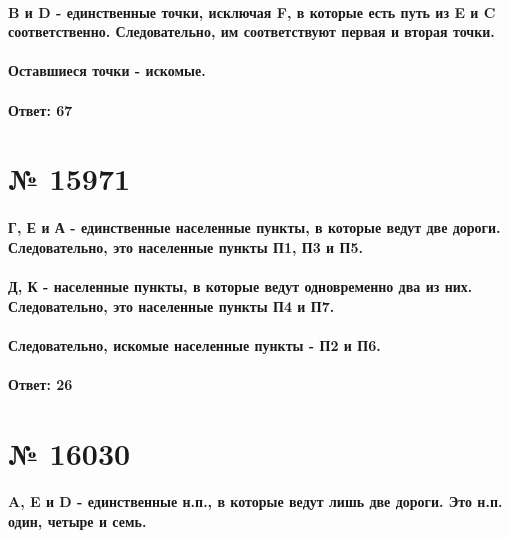\documentclass[11pt]{article} %
\begin{document}
\paragraph{B и D - единственные точки, исключая F, в которые есть путь из E и C соответственно. Следовательно, им соответствуют первая и вторая точки.}

\paragraph{Оставшиеся точки - искомые.}

\paragraph{Ответ: \textbf{67}}

\section{№ \textbf{15971}}

\paragraph{Г, Е и А - единственные населенные пункты, в которые ведут две дороги. Следовательно, это населенные пункты П1, П3 и П5.}

\paragraph{Д, К - населенные пункты, в которые ведут одновременно два из них. Следовательно, это населенные пункты П4 и П7.}

\paragraph{Следовательно, искомые населенные пункты - П2 и П6.}

\paragraph{Ответ: \textbf{26}}

\section{№ \textbf{16030}}

\paragraph{A, E и D - единственные н.п., в которые ведут лишь две дороги. Это н.п. один, четыре и семь.}
\end{document}
